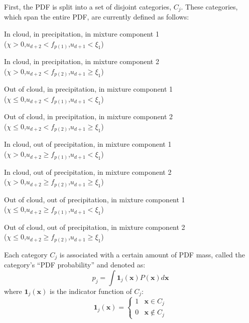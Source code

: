 \documentclass[11pt,fleqn]{article}
\begin{document}
First, the PDF is split into a set of disjoint categories, $C_j$. These
categories, which span the entire PDF, are currently defined as follows:
\begin{enumerate*}
\item In cloud, in precipitation, in mixture component 1 \\
($\chi > 0$,\quad$u_{d+2} < f_{p(1)}$,\quad$u_{d+1} < \xi_1$)
\item In cloud, in precipitation, in mixture component 2 \\
($\chi > 0$,\quad$u_{d+2} < f_{p(2)}$,\quad$u_{d+1} \ge \xi_1$)
\item Out of cloud, in precipitation, in mixture component 1 \\
($\chi \le 0$,\quad$u_{d+2} < f_{p(1)}$,\quad$u_{d+1} < \xi_1$)
\item Out of cloud, in precipitation, in mixture component 2 \\
($\chi \le 0$,\quad$u_{d+2} < f_{p(2)}$,\quad$u_{d+1} \ge \xi_1$)
\item In cloud, out of precipitation, in mixture component 1 \\
($\chi > 0$,\quad$u_{d+2} \ge f_{p(1)}$,\quad$u_{d+1} < \xi_1$)
\item In cloud, out of precipitation, in mixture component 2 \\
($\chi > 0$,\quad$u_{d+2} \ge f_{p(2)}$,\quad$u_{d+1} \ge \xi_1$)
\item Out of cloud, out of precipitation, in mixture component 1 \\
($\chi \le 0$,\quad$u_{d+2} \ge f_{p(1)}$,\quad$u_{d+1} < \xi_1$)
\item Out of cloud, out of precipitation, in mixture component 2 \\
($\chi \le 0$,\quad$u_{d+2} \ge f_{p(2)}$,\quad$u_{d+1} \ge \xi_1$)
\end{enumerate*}

Each category $C_j$ is associated with a certain amount of PDF mass, called the
category's ``PDF probability'' and denoted as:
\begin{equation}
p_j = \int \mathbf{1}_j(\mathbf{x}) P(\mathbf{x}) d\mathbf{x}
\end{equation}
where $\mathbf{1}_j(\mathbf{x})$ is the indicator function of $C_j$:
\begin{equation}
\mathbf{1}_j(\mathbf{x}) =
\begin{cases}
1 & \mathbf{x} \in C_j \\
0 & \mathbf{x} \notin C_j
\end{cases}
\end{equation}
\end{document}
